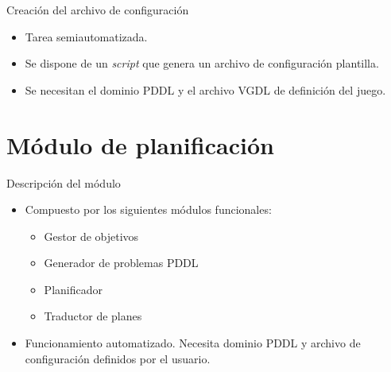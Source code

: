 \documentclass[11pt]{beamer}    %
\begin{document}
    \begin{frame}{Creación del archivo de configuración}
        \begin{itemize}
            \item Tarea semiautomatizada.
            \item Se dispone de un \textit{script} que genera un archivo de configuración
            plantilla.
            \item Se necesitan el dominio PDDL y el archivo VGDL de definición del juego. 
        \end{itemize}

    \end{frame}
    \section{Módulo de planificación}

    \begin{frame}{Descripción del módulo}
        \begin{itemize}
            \item Compuesto por los siguientes módulos funcionales:
            \begin{itemize}
                \item Gestor de objetivos
                \item Generador de problemas PDDL
                \item Planificador
                \item Traductor de planes
            \end{itemize}
            \item Funcionamiento automatizado. Necesita dominio PDDL y archivo de configuración
            definidos por el usuario.
        \end{itemize}

    \end{frame}
\end{document}
